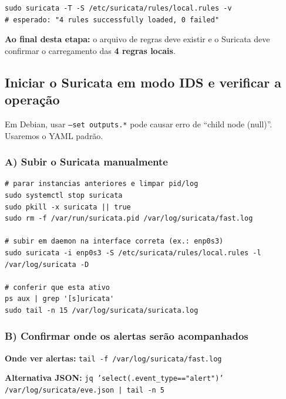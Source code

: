 \begin{lstlisting}
sudo suricata -T -S /etc/suricata/rules/local.rules -v
# esperado: "4 rules successfully loaded, 0 failed"
\end{lstlisting}


\begin{notebox}
\textbf{Ao final desta etapa:} o arquivo de regras deve existir e o Suricata deve confirmar o carregamento das \textbf{4 regras locais}.
\end{notebox}

\subsection{Iniciar o Suricata em modo IDS e verificar a operação}

\begin{warnbox}
Em Debian, usar \texttt{--set outputs.*} pode causar erro de ``child node (null)''. Usaremos o YAML padrão.
\end{warnbox}

\subsubsection*{A) Subir o Suricata manualmente}

\begin{lstlisting}
# parar instancias anteriores e limpar pid/log
sudo systemctl stop suricata
sudo pkill -x suricata || true
sudo rm -f /var/run/suricata.pid /var/log/suricata/fast.log

# subir em daemon na interface correta (ex.: enp0s3)
sudo suricata -i enp0s3 -S /etc/suricata/rules/local.rules -l /var/log/suricata -D

# conferir que esta ativo
ps aux | grep '[s]uricata'
sudo tail -n 15 /var/log/suricata/suricata.log
\end{lstlisting}


\subsubsection*{B) Confirmar onde os alertas serão acompanhados}

\textbf{Onde ver alertas:} \texttt{tail -f /var/log/suricata/fast.log}

\textbf{Alternativa JSON:} \texttt{jq 'select(.event\_type=="alert")' /var/log/suricata/eve.json | tail -n 5}

